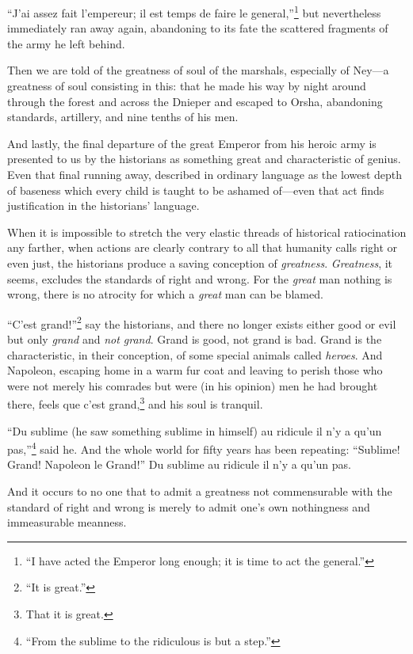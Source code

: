 ``J'ai assez fait l'empereur; il est temps de faire le
general,''\footnote{``I have acted the Emperor long enough; it is
time to act the general.''} but nevertheless immediately ran away
again, abandoning to its fate the scattered fragments of the army
he left behind.

Then we are told of the greatness of soul of the marshals,
especially of Ney---a greatness of soul consisting in this: that
he made his way by night around through the forest and across the
Dnieper and escaped to Orsha, abandoning standards, artillery,
and nine tenths of his men.

And lastly, the final departure of the great Emperor from his
heroic army is presented to us by the historians as something
great and characteristic of genius. Even that final running away,
described in ordinary language as the lowest depth of baseness
which every child is taught to be ashamed of---even that act
finds justification in the historians' language.

When it is impossible to stretch the very elastic threads of
historical ratiocination any farther, when actions are clearly
contrary to all that humanity calls right or even just, the
historians produce a saving conception of \emph{greatness}.
\emph{Greatness}, it seems, excludes the standards of right and
wrong. For the \emph{great} man nothing is wrong, there is no
atrocity for which a \emph{great} man can be blamed.

``C'est grand!''\footnote{``It is great.''} say the historians,
and there no longer exists either good or evil but only
\emph{grand} and \emph{not grand}. Grand is good, not grand is
bad. Grand is the characteristic, in their conception, of some
special animals called \emph{heroes}. And Napoleon, escaping home
in a warm fur coat and leaving to perish those who were not
merely his comrades but were (in his opinion) men he had brought
there, feels que c'est grand,\footnote{That it is great.} and his
soul is tranquil.

``Du sublime (he saw something sublime in himself) au ridicule il
n'y a qu'un pas,''\footnote{``From the sublime to the ridiculous
is but a step.''} said he. And the whole world for fifty years
has been repeating: ``Sublime! Grand! Napoleon le Grand!'' Du
sublime au ridicule il n'y a qu'un pas.

And it occurs to no one that to admit a greatness not
commensurable with the standard of right and wrong is merely to
admit one's own nothingness and immeasurable meanness.

